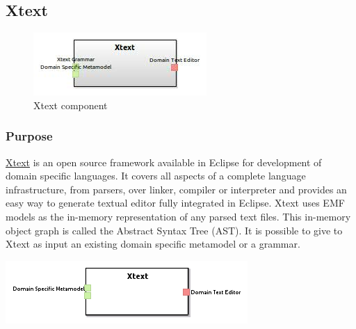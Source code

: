 \documentclass{gemoc} %
\begin{document}
\subsection{Xtext}

\begin{figure}[htp]
	\begin{center}
	\includegraphics*[trim=0.0cm 0.0cm 0cm 0.0cm, clip=true, scale=1.0]{../images/generated/Generated_Xtext.jpg}
	\caption{Xtext component}
	\end{center}
\end{figure}

\subsubsection{Purpose}
\href{http://www.eclipse.org/Xtext}{Xtext} is an open source framework available in Eclipse for development of domain specific languages.
It covers all aspects of a complete language infrastructure, from parsers, over linker, compiler or interpreter and provides an easy way to generate textual editor fully integrated in Eclipse.
Xtext uses EMF models as the in-memory representation of any parsed text files. This in-memory object graph is called the Abstract Syntax Tree (AST).
It is possible to give to Xtext as input an existing domain specific metamodel or a grammar.
\begin{center}
\includegraphics*[trim=0.0cm 0.0cm 0cm 0.0cm, clip=true]{../images/generated/Generated_Xtext.png}
\end{center}
\end{document}
